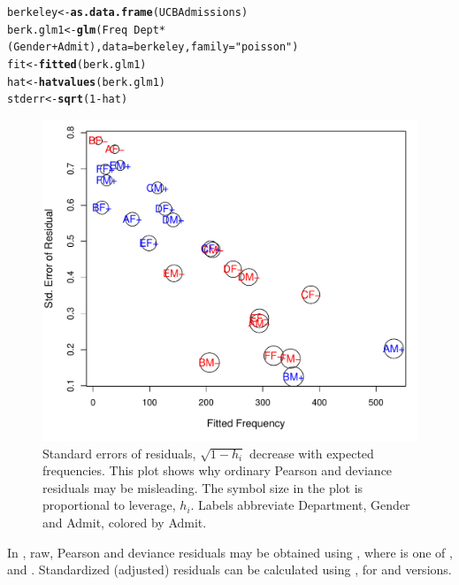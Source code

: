 \documentclass[11pt]{book}\usepackage[]{graphicx}\usepackage[]{color}
\makeatletter
\newcommand{\hlnum}[1]{\textcolor[rgb]{0.686,0.059,0.569}{#1}}%
\newcommand{\hlstr}[1]{\textcolor[rgb]{0.192,0.494,0.8}{#1}}%
\newcommand{\hlopt}[1]{\textcolor[rgb]{0,0,0}{#1}}%
\newcommand{\hlstd}[1]{\textcolor[rgb]{0.345,0.345,0.345}{#1}}%
\newcommand{\hlkwb}[1]{\textcolor[rgb]{0.69,0.353,0.396}{#1}}%
\newcommand{\hlkwc}[1]{\textcolor[rgb]{0.333,0.667,0.333}{#1}}%
\newcommand{\hlkwd}[1]{\textcolor[rgb]{0.737,0.353,0.396}{\textbf{#1}}}%
\newenvironment{kframe}{%
 \def\at@end@of@kframe{}%
 \ifinner\ifhmode%
  \def\at@end@of@kframe{\end{minipage}}%
  \begin{minipage}{\columnwidth}%
 \fi\fi%
 \def\FrameCommand##1{\hskip\@totalleftmargin \hskip-\fboxsep
 \colorbox{shadecolor}{##1}\hskip-\fboxsep
     \hskip-\linewidth \hskip-\@totalleftmargin \hskip\columnwidth}%
 \MakeFramed {\advance\hsize-\width
   \@totalleftmargin\z@ \linewidth\hsize
   \@setminipage}}%
 {\par\unskip\endMakeFramed%
 \at@end@of@kframe}
\newenvironment{knitrout}{}{} %
\renewenvironment{knitrout}{\small\renewcommand{\baselinestretch}{.85}}{} %
\makeatother
\begin{document}
\begin{knitrout}
\color{fgcolor}\begin{kframe}
\begin{alltt}
\hlstd{berkeley} \hlkwb{<-} \hlkwd{as.data.frame}\hlstd{(UCBAdmissions)}
\hlstd{berk.glm1} \hlkwb{<-} \hlkwd{glm}\hlstd{(Freq} \hlopt{~} \hlstd{Dept} \hlopt{*} \hlstd{(Gender}\hlopt{+}\hlstd{Admit),} \hlkwc{data}\hlstd{=berkeley,} \hlkwc{family}\hlstd{=}\hlstr{"poisson"}\hlstd{)}
\hlstd{fit} \hlkwb{<-} \hlkwd{fitted}\hlstd{(berk.glm1)}
\hlstd{hat} \hlkwb{<-} \hlkwd{hatvalues}\hlstd{(berk.glm1)}
\hlstd{stderr} \hlkwb{<-} \hlkwd{sqrt}\hlstd{(}\hlnum{1}\hlopt{-}\hlstd{hat)}
\end{alltt}
\end{kframe}
\end{knitrout}
\begin{knitrout}
\color{fgcolor}\begin{figure}[!htbp]


\centerline{\includegraphics[width=.7\textwidth]{ch08/fig/stres-plot-1} }

\caption[Standard errors of residuals, ]{Standard errors of residuals, $\sqrt{1-h_i}$ decrease with expected frequencies. This plot shows why ordinary Pearson and deviance residuals may be misleading.  The symbol size in the plot is proportional to leverage, $h_i$. Labels abbreviate Department, Gender and Admit, colored by Admit.\label{fig:stres-plot}}
\end{figure}


\end{knitrout}


In \R, raw, Pearson and deviance residuals may be obtained using
, where  is one of
,  and .
Standardized (adjusted) residuals can be calculated using
, for  and 
versions.
\end{document}
